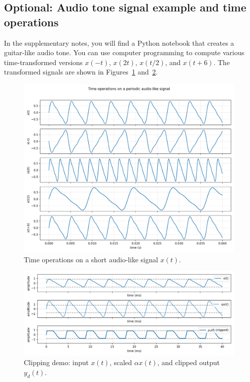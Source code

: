\documentclass{ee102_notes}
\begin{document}
\subsection{Optional: Audio tone signal example and time operations}
In the supplementary notes, you will find a Python notebook that creates a guitar-like audio tone. You can use computer programming to compute various time-transformed versions $x(-t)$, $x(2t)$, $x(t/2)$, and $x(t+6)$. The transformed signals are shown in Figures~\ref{fig:week2_ops} and~\ref{fig:week2_clip}. 
\begin{figure}[h]
  \centering
  \includegraphics[width=\linewidth]{figs/week2_ops.png}
  \caption{Time operations on a short audio-like signal $x(t)$.}
    \label{fig:week2_ops}
\end{figure}
\begin{figure}[h]
  \centering
  \includegraphics[width=\linewidth]{figs/week2_clip.png}
  \caption{Clipping demo: input $x(t)$, scaled $\alpha x(t)$, and clipped output $y_d(t)$.}
  \label{fig:week2_clip}
\end{figure}
\end{document}

